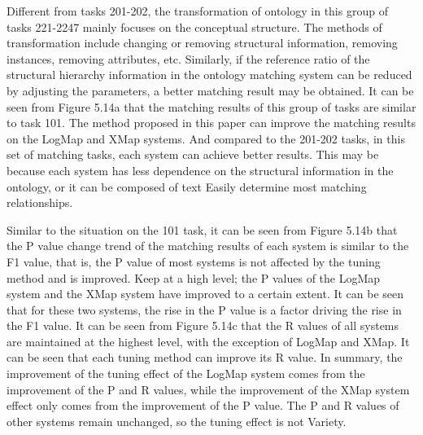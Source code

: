 \documentclass[twoside]{article}
\begin{document}
Different from tasks 201-202, the transformation of ontology in this group of tasks 221-2247 mainly focuses on the conceptual structure. The methods of transformation include changing or removing structural information, removing instances, removing attributes, etc.
Similarly, if the reference ratio of the structural hierarchy information in the ontology matching system can be reduced by adjusting the parameters, a better matching result may be obtained.
It can be seen from Figure 5.14a that the matching results of this group of tasks are similar to task 101. The method proposed in this paper can improve the matching results on the LogMap and XMap systems.
And compared to the 201-202 tasks, in this set of matching tasks, each system can achieve better results. This may be because each system has less dependence on the structural information in the ontology, or it can be composed of text Easily determine most matching relationships.

Similar to the situation on the 101 task, it can be seen from Figure 5.14b that the P value change trend of the matching results of each system is similar to the F1 value, that is, the P value of most systems is not affected by the tuning method and is improved. Keep at a high level; the P values of the LogMap system and the XMap system have improved to a certain extent. It can be seen that for these two systems, the rise in the P value is a factor driving the rise in the F1 value.
It can be seen from Figure 5.14c that the R values of all systems are maintained at the highest level, with the exception of LogMap and XMap. It can be seen that each tuning method can improve its R value.
In summary, the improvement of the tuning effect of the LogMap system comes from the improvement of the P and R values, while the improvement of the XMap system effect only comes from the improvement of the P value. The P and R values of other systems remain unchanged, so the tuning effect is not Variety.
\end{document}
